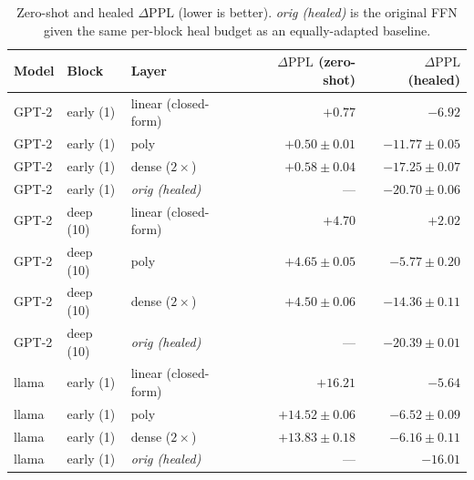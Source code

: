 \documentclass{article}
\newcommand{\dppl}{\Delta\mathrm{PPL}}
\begin{document}
\begin{table}[t]
  \centering
  \small
  \caption{Zero-shot and healed $\dppl$ (lower is better). \emph{orig (healed)} is the original
  FFN given the same per-block heal budget as an equally-adapted baseline.}
  \label{tab:ppl}
  \begin{tabular}{lllrr}
    \toprule
    Model & Block & Layer & $\dppl$ (zero-shot) & $\dppl$ (healed) \\
    \midrule
    GPT-2 & early (1) & linear (closed-form) & $\mathbf{+0.77}$ & $-6.92$ \\
    GPT-2 & early (1) & poly                 & $\mathbf{+0.50 \pm 0.01}$ & $-11.77 \pm 0.05$ \\
    GPT-2 & early (1) & dense ($2\times$)    & $\mathbf{+0.58 \pm 0.04}$ & $-17.25 \pm 0.07$ \\
    GPT-2 & early (1) & \emph{orig (healed)} & --- & $\mathbf{-20.70 \pm 0.06}$ \\
    GPT-2 & deep (10) & linear (closed-form) & $+4.70$ & $+2.02$ \\
    GPT-2 & deep (10) & poly                 & $+4.65 \pm 0.05$ & $-5.77 \pm 0.20$ \\
    GPT-2 & deep (10) & dense ($2\times$)    & $+4.50 \pm 0.06$ & $-14.36 \pm 0.11$ \\
    GPT-2 & deep (10) & \emph{orig (healed)} & --- & $\mathbf{-20.39 \pm 0.01}$ \\
    llama & early (1) & linear (closed-form) & $+16.21$ & $-5.64$ \\
    llama & early (1) & poly                 & $+14.52 \pm 0.06$ & $-6.52 \pm 0.09$ \\
    llama & early (1) & dense ($2\times$)    & $+13.83 \pm 0.18$ & $-6.16 \pm 0.11$ \\
    llama & early (1) & \emph{orig (healed)} & --- & $\mathbf{-16.01}$ \\
    \bottomrule
  \end{tabular}
\end{table}
\end{document}
